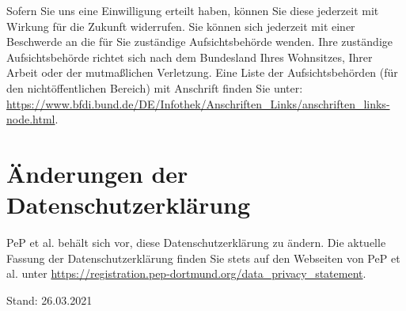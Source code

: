 \documentclass[
  fontsize=12pt,
  paper=a4,
  DIV14,
  parskip,
]{scrartcl}
\begin{document}
Sofern Sie uns eine Einwilligung erteilt haben, können Sie diese jederzeit
mit Wirkung für die Zukunft widerrufen. Sie können sich jederzeit mit einer
Beschwerde an die für Sie zuständige Aufsichtsbehörde wenden. Ihre zuständige
Aufsichtsbehörde richtet sich nach dem Bundesland Ihres Wohnsitzes, Ihrer
Arbeit oder der mutmaßlichen Verletzung. Eine Liste der Aufsichtsbehörden
(für den nichtöffentlichen Bereich) mit Anschrift finden Sie unter: \url{https://www.bfdi.bund.de/DE/Infothek/Anschriften_Links/anschriften_links-node.html}.

\section{Änderungen der Datenschutzerklärung}

PeP et al. behält sich vor, diese Datenschutzerklärung zu ändern. Die
aktuelle Fassung der Datenschutzerklärung finden Sie stets auf den Webseiten
von PeP et al. unter \url{https://registration.pep-dortmund.org/data_privacy_statement}.

Stand: 26.03.2021
\end{document}
